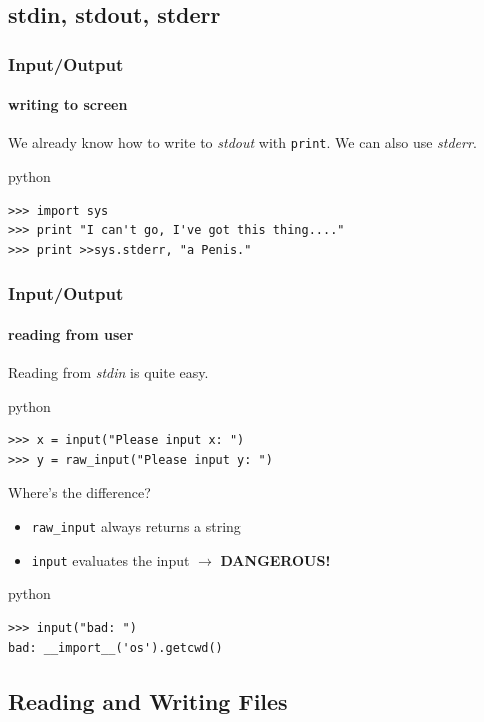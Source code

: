 \documentclass{beamer}
\begin{document}
\subsection{stdin, stdout, stderr}
    
\begin{frame}[fragile]
	\frametitle{Input/Output}
	\framesubtitle{writing to screen}
	
	We already know how to write to \emph{stdout} with \texttt{print}. We can also use \emph{stderr}.
	\begin{exampleblock}{python}
	\begin{lstlisting}
>>> import sys
>>> print "I can't go, I've got this thing...."
>>> print >>sys.stderr, "a Penis."
	\end{lstlisting}
	\end{exampleblock}
\end{frame}

\begin{frame}[fragile]
	\frametitle{Input/Output}
	\framesubtitle{reading from user}
	
	Reading from \emph{stdin} is quite easy.
	\begin{exampleblock}{python}
	\begin{lstlisting}
>>> x = input("Please input x: ")
>>> y = raw_input("Please input y: ")
	\end{lstlisting}
	\end{exampleblock}
	
\pause

	\begin{block}{Where's the difference?}
	\begin{itemize}
	\item \texttt{raw\_input} always returns a string 
\pause
	\item \texttt{input} evaluates the input \pause $ \rightarrow $ \textbf{DANGEROUS!}
	\end{itemize}
	\end{block}

\pause

	\begin{alertblock}{python}
	\begin{lstlisting}
>>> input("bad: ")
bad: __import__('os').getcwd()
	\end{lstlisting}
	\end{alertblock}

\end{frame}


\subsection{Reading and Writing Files}
\end{document}
